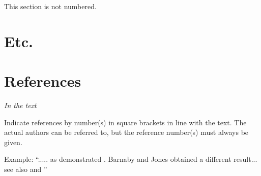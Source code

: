 \documentclass{IACpaper}
\begin{document}
    This section is not numbered.

  \section*{Etc.}

    \phantom{placeholder}

  \section*{References}

    \noindent\emph{In the text}

    Indicate references by number(s) in square brackets in line with the text. The actual authors can be referred to, but the reference number(s) must always be given.

    Example: ``..... as demonstrated \cite{somearticle,someconf}. Barnaby and Jones \cite{somebook} obtained a different result... see also \cite{somechapter} and \cite{somewebsite}''


    \printbibliography[heading=none]
\end{document}
